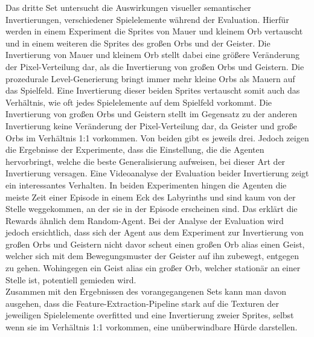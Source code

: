 Das dritte Set untersucht die Auswirkungen visueller semantischer Invertierungen, verschiedener Spielelemente während der Evaluation. Hierfür werden in einem Experiment die Sprites von Mauer und kleinem Orb vertauscht und in einem weiteren die Sprites des großen Orbs und der Geister. Die Invertierung von Mauer und kleinem Orb stellt dabei eine größere Veränderung der Pixel-Verteilung dar, als die Invertierung von großen Orbs und Geistern. Die prozedurale Level-Generierung bringt immer mehr kleine Orbs als Mauern auf das Spielfeld. Eine Invertierung dieser beiden Sprites vertauscht somit auch das Verhältnis, wie oft jedes Spielelemente auf dem Spielfeld vorkommt. Die Invertierung von großen Orbs und Geistern stellt im Gegensatz zu der anderen Invertierung keine Veränderung der Pixel-Verteilung dar, da Geister und große Orbs im Verhältnis 1:1 vorkommen. Von beiden gibt es jeweils drei. Jedoch zeigen die Ergebnisse der Experimente, dass die Einstellung, die die Agenten hervorbringt, welche die beste Generalisierung aufweisen, bei dieser Art der Invertierung versagen. Eine Videoanalyse der Evaluation beider Invertierung zeigt ein interessantes Verhalten. In beiden Experimenten hingen die Agenten die meiste Zeit einer Episode in einem Eck des Labyrinths und sind kaum von der Stelle weggekommen, an der sie in der Episode erscheinen sind. Das erklärt die Rewards ähnlich dem Random-Agent. Bei der Analyse der Evaluation wird jedoch ersichtlich, dass sich der Agent aus dem Experiment zur Invertierung von großen Orbs und Geistern nicht davor scheut einen großen Orb alias einen Geist, welcher sich mit dem Bewegungsmuster der Geister auf ihn zubewegt, entgegen zu gehen. Wohingegen ein Geist alias ein großer Orb, welcher stationär an einer Stelle ist, potentiell gemieden wird. \\
Zusammen mit den Ergebnissen des vorangegangenen Sets kann man davon ausgehen, dass die Feature-Extraction-Pipeline stark auf die Texturen der jeweiligen Spielelemente overfitted und eine Invertierung zweier Sprites, selbst wenn sie im Verhältnis 1:1 vorkommen, eine unüberwindbare Hürde darstellen. \newline

